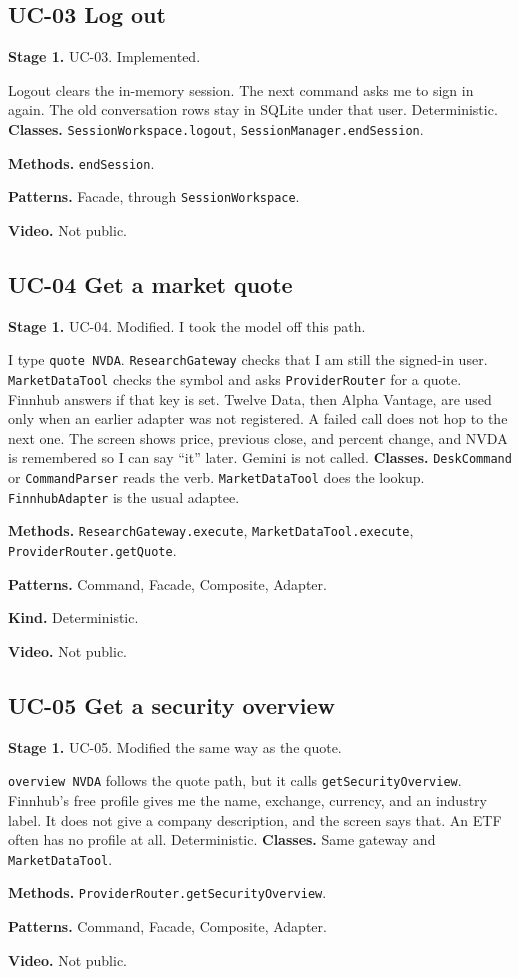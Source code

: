 \documentclass[11pt]{article}
\newcommand{\field}[2]{\textbf{#1.} #2\par}
\begin{document}
\subsection{UC-03 Log out}
\field{Stage 1}{UC-03. Implemented.}
Logout clears the in-memory session. The next command asks me to sign in again. The old conversation rows stay in SQLite under that user. Deterministic.
\field{Classes}{\texttt{SessionWorkspace.logout}, \texttt{SessionManager.endSession}.}
\field{Methods}{\texttt{endSession}.}
\field{Patterns}{Facade, through \texttt{SessionWorkspace}.}
\field{Video}{Not public.}

\subsection{UC-04 Get a market quote}
\field{Stage 1}{UC-04. Modified. I took the model off this path.}
I type \texttt{quote NVDA}. \texttt{ResearchGateway} checks that I am still the signed-in user. \texttt{MarketDataTool} checks the symbol and asks \texttt{ProviderRouter} for a quote. Finnhub answers if that key is set. Twelve Data, then Alpha Vantage, are used only when an earlier adapter was not registered. A failed call does not hop to the next one. The screen shows price, previous close, and percent change, and NVDA is remembered so I can say ``it'' later. Gemini is not called.
\field{Classes}{\texttt{DeskCommand} or \texttt{CommandParser} reads the verb. \texttt{MarketDataTool} does the lookup. \texttt{FinnhubAdapter} is the usual adaptee.}
\field{Methods}{\texttt{ResearchGateway.execute}, \texttt{MarketDataTool.execute}, \texttt{ProviderRouter.getQuote}.}
\field{Patterns}{Command, Facade, Composite, Adapter.}
\field{Kind}{Deterministic.}
\field{Video}{Not public.}

\subsection{UC-05 Get a security overview}
\field{Stage 1}{UC-05. Modified the same way as the quote.}
\texttt{overview NVDA} follows the quote path, but it calls \texttt{getSecurityOverview}. Finnhub's free profile gives me the name, exchange, currency, and an industry label. It does not give a company description, and the screen says that. An ETF often has no profile at all. Deterministic.
\field{Classes}{Same gateway and \texttt{MarketDataTool}.}
\field{Methods}{\texttt{ProviderRouter.getSecurityOverview}.}
\field{Patterns}{Command, Facade, Composite, Adapter.}
\field{Video}{Not public.}
\end{document}

